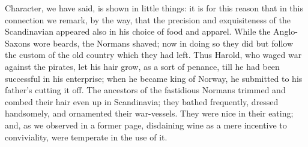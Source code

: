 Character, we have said, is
shown in little things: it is for this reason that in this connection
we remark, by the way, that the precision and exquisiteness of the
Scandinavian appeared also in his choice of food and apparel. While
the Anglo-Saxons wore beards, the Normans shaved; now in doing so they
did but follow the custom of the old country which they had left. Thus
Harold, who waged war against the pirates, let his hair grow, as a
sort of penance, till he had been successful in his enterprise; when
he became king of Norway, he submitted to his father's cutting it off.
The ancestors of the fastidious Normans trimmed and combed their hair
even up in Scandinavia; they bathed frequently, dressed handsomely,
and ornamented their war-vessels. They were nice in their eating; and,
as we observed in a former page, disdaining wine as a mere incentive
to conviviality, were temperate in the use of it.

